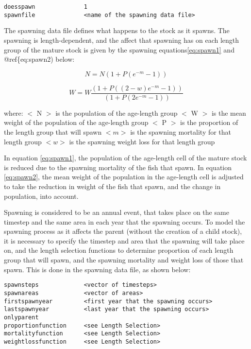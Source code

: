 \documentclass[]{book}
\begin{document}
\begin{verbatim}
doesspawn              1
spawnfile              <name of the spawning data file>
\end{verbatim}

The spawning data file defines what happens to the stock as it spawns.
The spawning is length-dependent, and the affect that spawning has on
each length group of the mature stock is given by the spawning
equations\eqref{eq:spawn1} and
@ref\{eq:spawn2)
below:

\begin{equation}
\label{eq:spawn1}
N = N {\left(1 + P {(e^{-m} - 1)}\right)}\end{equation}

\begin{equation}
\label{eq:spawn2}
W = W \frac{\left(1 + P {((2 - w)e^{-m} - 1)}\right)}{\left(1 + P {(2e^{-m} - 1)}\right)}\end{equation}

where: \(<\) N \(>\) is the population of the age-length group \(<\) W \(>\) is
the mean weight of the population of the age-length group \(<\) P \(>\) is
the proportion of the length group that will spawn \(<m>\) is the spawning
mortality for that length group \(<w>\) is the spawning weight loss for
that length group

In equation \eqref{eq:spawn1}, the population of the age-length cell of the
mature stock is reduced due to the spawning mortality of the fish that
spawn. In equation \eqref{eq:spawn2}, the mean weight of the population in the
age-length cell is adjusted to take the reduction in weight of the fish
that spawn, and the change in population, into account.

Spawning is considered to be an annual event, that takes place on the
same timestep and the same area in each year that the spawning occurs.
To model the spawning process as it affects the parent (without the
creation of a child stock), it is necessary to specify the timestep and
area that the spawning will take place on, and the length selection
functions to determine proportion of each length group that will spawn,
and the spawning mortality and weight loss of those that spawn. This is
done in the spawning data file, as shown below:

\begin{verbatim}
spawnsteps             <vector of timesteps>
spawnareas             <vector of areas>
firstspawnyear         <first year that the spawning occurs>
lastspawnyear          <last year that the spawning occurs>
onlyparent
proportionfunction     <see Length Selection>
mortalityfunction      <see Length Selection>
weightlossfunction     <see Length Selection>
\end{verbatim}
\end{document}
